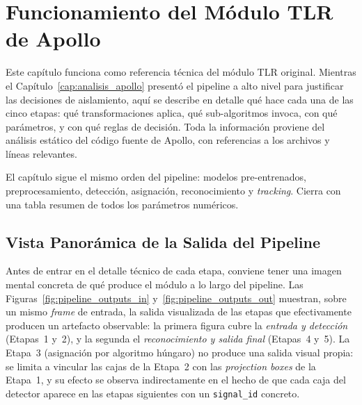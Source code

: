 \chapter{Funcionamiento del Módulo TLR de Apollo}
\label{cap:funcionamiento_tlr}

Este capítulo funciona como referencia técnica del módulo TLR original. Mientras el Capítulo~\ref{cap:analisis_apollo} presentó el pipeline a alto nivel para justificar las decisiones de aislamiento, aquí se describe en detalle qué hace cada una de las cinco etapas: qué transformaciones aplica, qué sub-algoritmos invoca, con qué parámetros, y con qué reglas de decisión. Toda la información proviene del análisis estático del código fuente de Apollo, con referencias a los archivos y líneas relevantes.

El capítulo sigue el mismo orden del pipeline: modelos pre-entrenados, preprocesamiento, detección, asignación, reconocimiento y \textit{tracking}. Cierra con una tabla resumen de todos los parámetros numéricos.

\section{Vista Panorámica de la Salida del Pipeline}
\label{sec:funcionamiento_panoramica}

Antes de entrar en el detalle técnico de cada etapa, conviene tener una imagen mental concreta de qué produce el módulo a lo largo del pipeline. Las Figuras~\ref{fig:pipeline_outputs_in} y~\ref{fig:pipeline_outputs_out} muestran, sobre un mismo \textit{frame} de entrada, la salida visualizada de las etapas que efectivamente producen un artefacto observable: la primera figura cubre la \textit{entrada y detección} (Etapas~1 y~2), y la segunda el \textit{reconocimiento y salida final} (Etapas~4 y~5). La Etapa~3 (asignación por algoritmo húngaro) no produce una salida visual propia: se limita a vincular las cajas de la Etapa~2 con las \textit{projection boxes} de la Etapa~1, y su efecto se observa indirectamente en el hecho de que cada caja del detector aparece en las etapas siguientes con un \texttt{signal\_id} concreto.

